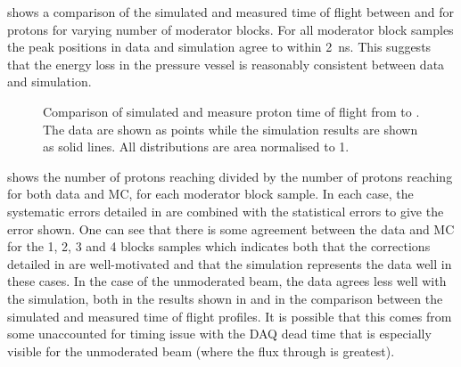  shows a comparison of the simulated and measured time of flight between \STwo and \SFour for protons for varying number of moderator blocks.
For all moderator block samples the peak positions in data and simulation agree to within \SI{2}{\nano\second}.
This suggests that the energy loss in the pressure vessel is reasonably consistent between data and simulation.

\begin{figure}[h]
  \begin{adjustbox}{max totalsize=.65\textwidth, center}
    
  \end{adjustbox}
  \caption[Comparison of simulated and measure proton time of flight from \STwo to \SFour]{Comparison of simulated and measure proton time of flight from \STwo to \SFour. The data are shown as points while the simulation results are shown as solid lines. All distributions are area normalised to 1.}
  \label{fig:tofS4Sim}
\end{figure}

 shows the number of protons reaching \SFour divided by the number of protons reaching \SThree for both data and MC, for each moderator block sample.
In each case, the systematic errors detailed in  are combined with the statistical errors to give the error shown.
One can see that there is some agreement between the data and MC for the 1, 2, 3 and 4 blocks samples which indicates both that the corrections detailed in  are well-motivated and that the simulation represents the data well in these cases.
In the case of the unmoderated beam, the data agrees less well with the simulation, both in the results shown in  and in the comparison between the simulated and measured time of flight profiles.
It is possible that this comes from some unaccounted for timing issue with the \SThree DAQ dead time that is especially visible for the unmoderated beam (where the flux through \SOne is greatest). 

